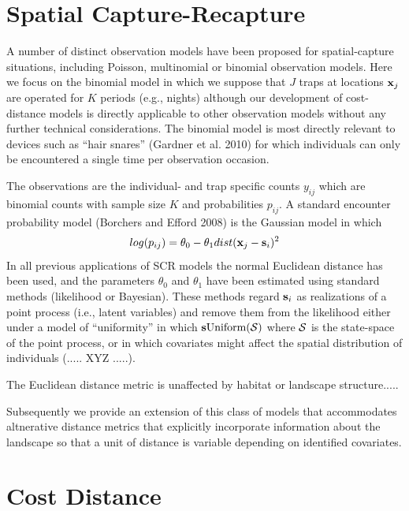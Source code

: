 \section{Spatial Capture-Recapture}

A number of distinct observation models have been proposed for
spatial-capture situations, including Poisson, multinomial or binomial
observation models. Here we focus on the binomial model in
which we suppose that $J$ traps at locations ${\bf x}_{j}$ are
operated for $K$ periods (e.g., nights) although our development of
cost-distance models is directly applicable to other observation
models without any further technical considerations. The binomial
model is most directly relevant to devices such as ``hair snares''
(Gardner et al. 2010) for which individuals can only be encountered a
single time per observation occasion. 

The observations are the
individual- and trap specific counts $y_{ij}$ which are binomial
counts with sample size $K$ and probabilities $p_{ij}$. A standard
encounter probability model (Borchers and Efford 2008) is the Gaussian model in which 
\[
log(p_{ij})= \theta_{0} - \theta_{1} dist({\bf x}_{j} - {\bf s}_{i})^{2}
\]
In all previous applications of SCR models the normal Euclidean
distance has been used, and the parameters $\theta_0$ and $\theta_1$
have been estimated using standard methods (likelihood or
Bayesian). These methods regard ${\bf s}_{i}$ as realizations of a
point process (i.e., latent variables) and
remove them from the likelihood either under a model of ``uniformity''
in which ${\bf s} \mbox{Uniform}({\cal S})$ where ${\cal S}$ is the
state-space of the point process, or in which covariates might affect
the spatial distribution of individuals (..... XYZ .....).

The Euclidean distance metric is unaffected by habitat or landscape
structure.....

Subsequently we provide an extension of this class of models that
accommodates altnerative distance metrics that explicitly incorporate
information about the landscape so that a unit of distance is variable
depending on identified covariates. 

\section{Cost Distance}

